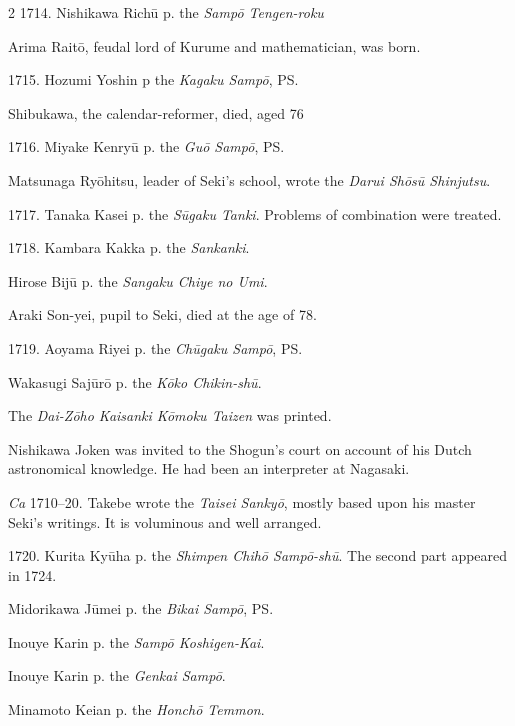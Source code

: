 \documentclass[11pt]{article}
\newcommand{\scanfooter}{}
\begin{document}
\begin{multicols}{2}
1714. Nishikawa Richū p. the \emph{Sampō Tengen-roku}

Arima Raitō, feudal lord of Kurume and mathematician, was born.

1715. Hozumi Yoshin p the \emph{Kagaku Sampō}, PS.

Shibukawa, the calendar-reformer, died, aged 76

1716. Miyake Kenryū p. the \emph{Guō Sampō}, PS.

Matsunaga Ryōhitsu, leader of Seki's school, wrote the \emph{Darui Shōsū Shinjutsu}.

1717. Tanaka Kasei p. the \emph{Sūgaku Tanki}. Problems of combination were treated.

1718. Kambara Kakka p. the \emph{Sankanki}.

Hirose Bijū p. the \emph{Sangaku Chiye no Umi}.

Araki Son-yei, pupil to Seki, died at the age of 78.

1719. Aoyama Riyei p. the \emph{Chūgaku Sampō}, PS.

Wakasugi Sajūrō p. the \emph{Kōko Chikin-shū}.

The \emph{Dai-Zōho Kaisanki Kōmoku Taizen} was printed.

Nishikawa Joken was invited to the Shogun's court on account of his Dutch astronomical knowledge. He had been an interpreter at Nagasaki.

\emph{Ca} 1710--20. Takebe wrote the \emph{Taisei Sankyō}, mostly based upon his master Seki's writings. It is voluminous and well arranged.

1720. Kurita Kyūha p. the \emph{Shimpen Chihō Sampō-shū}. The second part appeared in 1724.

Midorikawa Jūmei p. the \emph{Bikai Sampō}, PS.

Inouye Karin p. the \emph{Sampō Koshigen-Kai}.

Inouye Karin p. the \emph{Genkai Sampō}.

Minamoto Keian p. the \emph{Honchō Temmon}.
\end{multicols}
\scanfooter
\end{document}
